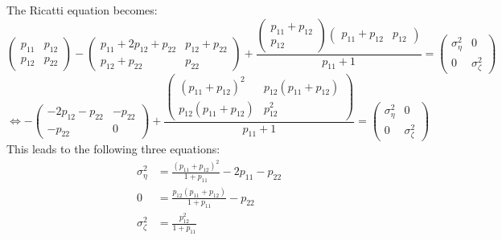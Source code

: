 The Ricatti equation becomes:
\begin{equation}
\begin{pmatrix}p_{11} & p_{12}\\p_{12} & p_{22}\end{pmatrix} - \begin{pmatrix}p_{11} + 2p_{12}+p_{22}& p_{12}+p_{22}\\p_{12}+p_{22} & p_{22}\end{pmatrix} + \frac{\begin{pmatrix}p_{11} +p_{12}\\p_{12}\end{pmatrix} \begin{pmatrix}p_{11} +p_{12} & p_{12}\end{pmatrix} }{p_{11}+1} = \begin{pmatrix}\sigma_\eta^2 & 0\\0 & \sigma_\zeta^2\end{pmatrix} 
\end{equation}
\begin{equation}
\Leftrightarrow
- \begin{pmatrix}-2p_{12}-p_{22}& -p_{22}\\-p_{22} & 0\end{pmatrix} + \frac{\begin{pmatrix}(p_{11} +p_{12})^2 & p_{12}(p_{11}+p_{12}) \\ p_{12}(p_{11}+p_{12}) & p_{12}^2\end{pmatrix}}{p_{11}+1} = \begin{pmatrix}\sigma_\eta^2 & 0\\0 & \sigma_\zeta^2\end{pmatrix}
\end{equation}
This leads to the following three equations:
\begin{equation} \label{eq:sigmaconditions}
\begin{split}
\sigma_{\eta}^2 &= \frac{(p_{11}+p_{12})^2}{1+p_{11}} - 2p_{11} - p_{22}\\
0 &= \frac{p_{12}(p_{11}+p_{12})}{1+p_{11}} - p_{22}\\
\sigma_{\zeta}^2 &= \frac{p^2_{12}}{1+p_{11}}
\end{split}
\end{equation}

